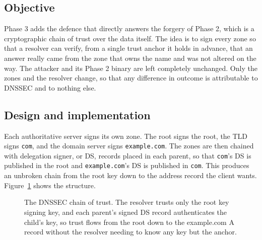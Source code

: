 \documentclass[11pt]{article}
\begin{document}
\subsection{Objective}

Phase 3 adds the defence that directly answers the forgery of Phase 2, which is a
cryptographic chain of trust over the data itself. The idea is to sign every zone
so that a resolver can verify, from a single trust anchor it holds in advance, that
an answer really came from the zone that owns the name and was not altered on the
way. The attacker and its Phase 2 binary are left completely unchanged. Only the
zones and the resolver change, so that any difference in outcome is attributable to
DNSSEC and to nothing else.

\subsection{Design and implementation}

Each authoritative server signs its own zone. The root signs the root, the TLD
signs \texttt{com}, and the domain server signs \texttt{example.com}. The zones are
then chained with delegation signer, or DS, records placed in each parent, so that
\texttt{com}'s DS is published in the root and \texttt{example.com}'s DS is
published in \texttt{com}. This produces an unbroken chain from the root key down to
the address record the client wants. Figure~\ref{fig:p3-chain} shows the structure.

\begin{figure}[H]
\centering
{}
\caption{The DNSSEC chain of trust. The resolver trusts only the root key signing key, and each parent's signed DS record authenticates the child's key, so trust flows from the root down to the example.com A record without the resolver needing to know any key but the anchor.}
\label{fig:p3-chain}
\end{figure}
\end{document}
